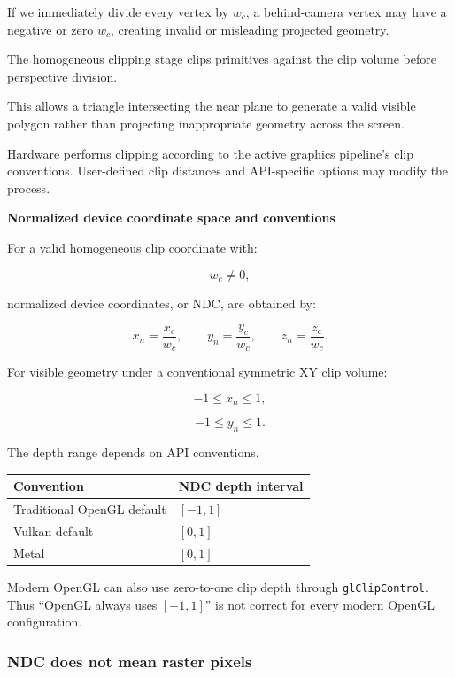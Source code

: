 If we immediately divide every vertex by \(w_c\), a behind-camera vertex may have a negative or zero \(w_c\), creating invalid or misleading projected geometry.

The homogeneous clipping stage clips primitives against the clip volume before perspective division.

This allows a triangle intersecting the near plane to generate a valid visible polygon rather than projecting inappropriate geometry across the screen.

Hardware performs clipping according to the active graphics pipeline's clip conventions. User-defined clip distances and API-specific options may modify the process.

\textbf{Normalized device coordinate space and conventions}

For a valid homogeneous clip coordinate with:

\[
 w_c\ne0,
\]

normalized device coordinates, or NDC, are obtained by:

\[
 \boxed{ x_n=\frac{x_c}{w_c}, \qquad y_n=\frac{y_c}{w_c}, \qquad z_n=\frac{z_c}{w_c} }.
\]

For visible geometry under a conventional symmetric XY clip volume:

\[
 -1\le x_n\le1,
\]

\[
 -1\le y_n\le1.
\]

The depth range depends on API conventions.

{\def\LTcaptype{none} %
\begin{longtable}[]{@{}ll@{}}
\toprule\noalign{}
Convention & NDC depth interval \\
\midrule\noalign{}
\endhead
\bottomrule\noalign{}
\endlastfoot
Traditional OpenGL default & \([-1,1]\) \\
Vulkan default & \([0,1]\) \\
Metal & \([0,1]\) \\
\end{longtable}
}

Modern OpenGL can also use zero-to-one clip depth through \texttt{glClipControl}. Thus ``OpenGL always uses \([-1,1]\)'' is not correct for every modern OpenGL configuration. 

\subsubsection{NDC does not mean raster pixels}\label{ndc-does-not-mean-raster-pixels}

